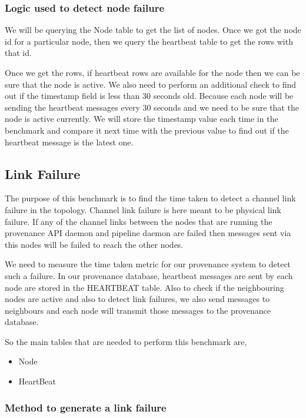 \subsubsection{Logic used to detect node failure}

We will be querying the Node table to get the list of nodes. Once we got the node id for a particular node, then we query the heartbeat table to get the rows with that id.

Once we get the rows, if heartbeat rows are available for the node then we can be sure that the node is active. We also need to perform an additional check to find out if the timestamp field is less than 30 seconds old. Because each node will be sending the heartbeat messages every 30 seconds and we need to be sure that the node is active currently. We will store the timestamp value each time in the benchmark and compare it next time with the previous value to find out if the heartbeat message is the latest one.

\subsection{Link Failure}

The purpose of this benchmark is to find the time taken to detect a channel link failure in the topology. Channel link failure is here meant to be physical link failure. If any of the channel links between the nodes that are running the provenance API daemon and pipeline daemon are failed then messages sent via this nodes will be failed to reach the other nodes.

We need to measure the time taken metric for our provenance system to detect such a failure. In our provenance database, heartbeat messages are sent by each node are stored in the HEARTBEAT table. Also to check if the neighbouring nodes are active and also to detect link failures, we also send messages to neighbours and each node will transmit those messages to the provenance database. 

So the main tables that are needed to perform this benchmark are,
    \begin{itemize}
        \item Node
        \item HeartBeat
    \end{itemize}

\subsubsection{Method to generate a link failure}

